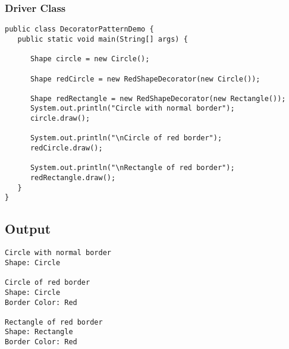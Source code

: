 \subsubsection{Driver Class}

\begin{verbatim}
public class DecoratorPatternDemo {
   public static void main(String[] args) {

      Shape circle = new Circle();

      Shape redCircle = new RedShapeDecorator(new Circle());

      Shape redRectangle = new RedShapeDecorator(new Rectangle());
      System.out.println("Circle with normal border");
      circle.draw();

      System.out.println("\nCircle of red border");
      redCircle.draw();

      System.out.println("\nRectangle of red border");
      redRectangle.draw();
   }
}
\end{verbatim}

\subsection{Output}

\begin{verbatim}
Circle with normal border
Shape: Circle

Circle of red border
Shape: Circle
Border Color: Red

Rectangle of red border
Shape: Rectangle
Border Color: Red
\end{verbatim}
